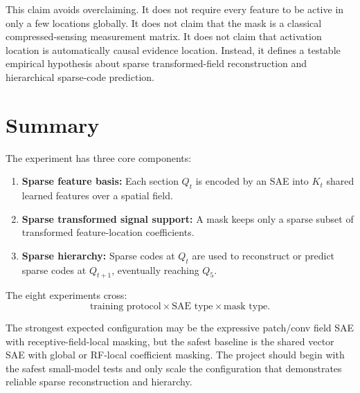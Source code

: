 \documentclass[11pt]{article}
\begin{document}
This claim avoids overclaiming. It does not require every feature to be active in only a few locations globally. It does not claim that the mask is a classical compressed-sensing measurement matrix. It does not claim that activation location is automatically causal evidence location. Instead, it defines a testable empirical hypothesis about sparse transformed-field reconstruction and hierarchical sparse-code prediction.

\section{Summary}

The experiment has three core components:

\begin{enumerate}[leftmargin=*]
    \item \textbf{Sparse feature basis:} Each section \(Q_t\) is encoded by an SAE into \(K_t\) shared learned features over a spatial field.
    \item \textbf{Sparse transformed signal support:} A mask keeps only a sparse subset of transformed feature-location coefficients.
    \item \textbf{Sparse hierarchy:} Sparse codes at \(Q_t\) are used to reconstruct or predict sparse codes at \(Q_{t+1}\), eventually reaching \(Q_5\).
\end{enumerate}

The eight experiments cross:
\[
\text{training protocol}
\times
\text{SAE type}
\times
\text{mask type}.
\]

The strongest expected configuration may be the expressive patch/conv field SAE with receptive-field-local masking, but the safest baseline is the shared vector SAE with global or RF-local coefficient masking. The project should begin with the safest small-model tests and only scale the configuration that demonstrates reliable sparse reconstruction and hierarchy.
\end{document}
